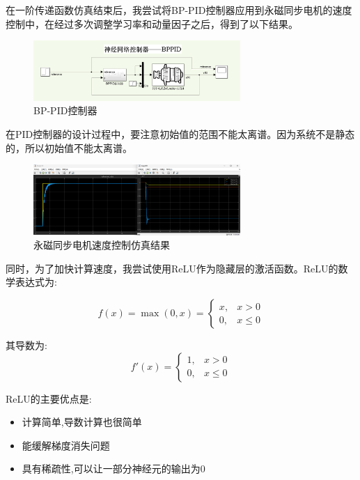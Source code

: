 \documentclass[12pt,a4paper,UTF8]{article}
\begin{document}
在一阶传递函数仿真结束后，我尝试将BP-PID控制器应用到永磁同步电机的速度控制中，在经过多次调整学习率和动量因子之后，得到了以下结果。
\begin{figure}[htbp] \centering \includegraphics[width=0.7\textwidth]{2024-12-30-13-32-46.png} \caption{BP-PID控制器}\end{figure}



在PID控制器的设计过程中，要注意初始值的范围不能太离谱。因为系统不是静态的，所以初始值不能太离谱。


\begin{figure}[htbp] \centering \includegraphics[width=0.7\textwidth]{2024-12-30-13-41-08.png} \caption{永磁同步电机速度控制仿真结果}\end{figure}

同时，为了加快计算速度，我尝试使用ReLU作为隐藏层的激活函数。ReLU的数学表达式为:

\begin{equation}
f(x) = \max(0,x) = \begin{cases}
x, & x > 0 \\
0, & x \leq 0
\end{cases}
\end{equation}

其导数为:
\begin{equation}
f'(x) = \begin{cases}
1, & x > 0 \\
0, & x \leq 0
\end{cases}
\end{equation}

ReLU的主要优点是:
\begin{itemize}
\item 计算简单,导数计算也很简单
\item 能缓解梯度消失问题
\item 具有稀疏性,可以让一部分神经元的输出为0
\end{itemize}
\end{document}
